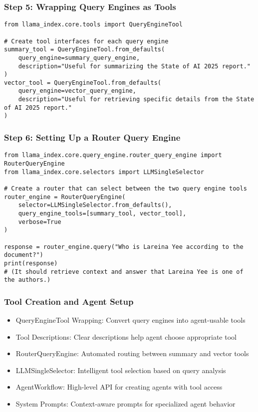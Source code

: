 \begin{frame}[fragile]\frametitle{Step 5: Wrapping Query Engines as Tools}


		\begin{lstlisting}
from llama_index.core.tools import QueryEngineTool

# Create tool interfaces for each query engine
summary_tool = QueryEngineTool.from_defaults(
    query_engine=summary_query_engine,
    description="Useful for summarizing the State of AI 2025 report."
)
vector_tool = QueryEngineTool.from_defaults(
    query_engine=vector_query_engine,
    description="Useful for retrieving specific details from the State of AI 2025 report."
)
		\end{lstlisting}	

\end{frame}

\begin{frame}[fragile]\frametitle{Step 6: Setting Up a Router Query Engine}


		\begin{lstlisting}
from llama_index.core.query_engine.router_query_engine import RouterQueryEngine
from llama_index.core.selectors import LLMSingleSelector

# Create a router that can select between the two query engine tools
router_engine = RouterQueryEngine(
    selector=LLMSingleSelector.from_defaults(),
    query_engine_tools=[summary_tool, vector_tool],
    verbose=True
)

response = router_engine.query("Who is Lareina Yee according to the document?")
print(response)
# (It should retrieve context and answer that Lareina Yee is one of the authors.)
		\end{lstlisting}	

\end{frame}



\begin{frame}[fragile]\frametitle{Tool Creation and Agent Setup}

      \begin{itemize}
		\item QueryEngineTool Wrapping: Convert query engines into agent-usable tools
		\item Tool Descriptions: Clear descriptions help agent choose appropriate tool
		\item RouterQueryEngine: Automated routing between summary and vector tools
		\item LLMSingleSelector: Intelligent tool selection based on query analysis
		\item AgentWorkflow: High-level API for creating agents with tool access
		\item System Prompts: Context-aware prompts for specialized agent behavior
	  \end{itemize}
  
\end{frame}

